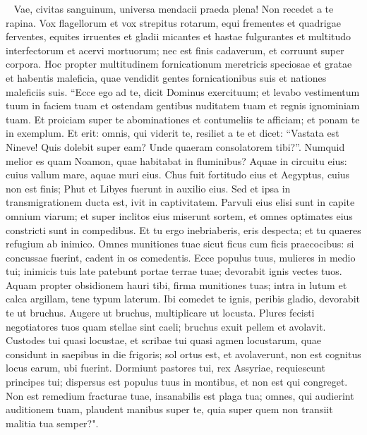\begin{biblechapter}   
\verse Vae, civitas sanguinum, universa mendacii praeda plena! Non recedet a te rapina. 
\verse Vox flagellorum et vox strepitus rotarum, equi frementes et quadrigae ferventes, equites irruentes 
\verse et gladii micantes et hastae fulgurantes et multitudo interfectorum et acervi mortuorum; nec est finis cadaverum, et corruunt super corpora. 
\verse Hoc propter multitudinem fornicationum meretricis speciosae et gratae et habentis maleficia, quae vendidit gentes fornicationibus suis et nationes maleficiis suis. 
\verse “Ecce ego ad te, dicit Dominus exercituum; et levabo vestimentum tuum in faciem tuam et ostendam gentibus nuditatem tuam et regnis ignominiam tuam. 
\verse Et proiciam super te abominationes et contumeliis te afficiam; et ponam te in exemplum. 
\verse Et erit: omnis, qui viderit te, resiliet a te et dicet: “Vastata est Nineve! Quis dolebit super eam? Unde quaeram consolatorem tibi?”. 
\verse Numquid melior es quam Noamon, quae habitabat in fluminibus? Aquae in circuitu eius: cuius vallum mare, aquae muri eius. 
\verse Chus fuit fortitudo eius et Aegyptus, cuius non est finis; Phut et Libyes fuerunt in auxilio eius. 
\verse Sed et ipsa in transmigrationem ducta est, ivit in captivitatem. Parvuli eius elisi sunt in capite omnium viarum; et super inclitos eius miserunt sortem, et omnes optimates eius constricti sunt in compedibus. 
\verse Et tu ergo inebriaberis, eris despecta; et tu quaeres refugium ab inimico. 
\verse Omnes munitiones tuae sicut ficus cum ficis praecocibus: si concussae fuerint, cadent in os comedentis. 
\verse Ecce populus tuus, mulieres in medio tui; inimicis tuis late patebunt portae terrae tuae; devorabit ignis vectes tuos. 
\verse Aquam propter obsidionem hauri tibi, firma munitiones tuas; intra in lutum et calca argillam, tene typum laterum. 
\verse Ibi comedet te ignis, peribis gladio, devorabit te ut bruchus. Augere ut bruchus, multiplicare ut locusta. 
\verse Plures fecisti negotiatores tuos quam stellae sint caeli; bruchus exuit pellem et avolavit. 
\verse Custodes tui quasi locustae, et scribae tui quasi agmen locustarum, quae considunt in saepibus in die frigoris; sol ortus est, et avolaverunt, non est cognitus locus earum, ubi fuerint. 
\verse Dormiunt pastores tui, rex Assyriae, requiescunt principes tui; dispersus est populus tuus in montibus, et non est qui congreget. 
\verse Non est remedium fracturae tuae, insanabilis est plaga tua; omnes, qui audierint auditionem tuam, plaudent manibus super te, quia super quem non transiit malitia tua semper?".
\end{biblechapter}

